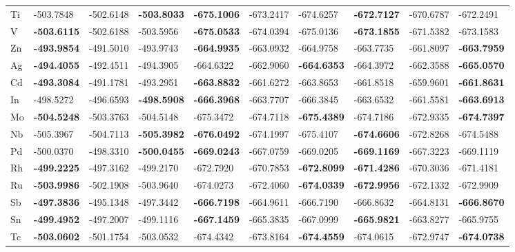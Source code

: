\begin{table}[htbp]
{\begin{tabular}{l *{9}{l}}
      Ti & -503.7848 & -502.6148 & \textbf{-503.8033} & \textbf{-675.1006} & -673.2417 & -674.6257 & \textbf{-672.7127} & -670.6787 & -672.2491 \\
      V  & \textbf{-503.6115} & -502.6188 & -503.5956 & \textbf{-675.0533} & -674.0394 & -675.0136 & \textbf{-673.1855} & -671.5382 & -673.1583 \\
      Zn & \textbf{-493.9854} & -491.5010 & -493.9743 & \textbf{-664.9935} & -663.0932 & -664.9758 & -663.7735 & -661.8097 & \textbf{-663.7959} \\
      Ag & \textbf{-494.4055} & -492.4511 & -494.3905 & -664.6322 & -662.9060 & \textbf{-664.6353} & -664.3972 & -662.3588 & \textbf{-665.0570} \\
      Cd & \textbf{-493.3084} & -491.1781 & -493.2951 & \textbf{-663.8832} & -661.6272 & -663.8653 & -661.8518 & -659.9601 & \textbf{-661.8631} \\
      In & -498.5272 & -496.6593 & \textbf{-498.5908} & \textbf{-666.3968} & -663.7707 & -666.3845 & -663.6532 & -661.5581 & \textbf{-663.6913} \\
      Mo & \textbf{-504.5248} & -503.3763 & -504.5148 & -675.3472 & -674.7118 & \textbf{-675.4389} & -674.7186 & -672.9335 & \textbf{-674.7397} \\
      Nb & -505.3967 & -504.7113 & \textbf{-505.3982} & \textbf{-676.0492} & -674.1997 & -675.4107 & \textbf{-674.6606} & -672.8268 & -674.5488 \\
      Pd & -500.0370 & -498.3310 & \textbf{-500.0455} & \textbf{-669.0243} & -667.0759 & -669.0205 & \textbf{-669.1169} & -667.3223 & -669.1119 \\
      Rh & \textbf{-499.2225} & -497.3162 & -499.2170 & -672.7920 & -670.7853 & \textbf{-672.8099} & \textbf{-671.4286} & -670.3036 & -671.4181 \\
      Ru & \textbf{-503.9986} & -502.1908 & -503.9640 & -674.0273 & -672.4060 & \textbf{-674.0339} & \textbf{-672.9956} & -672.1332 & -672.9909 \\
      Sb & \textbf{-497.3836} & -495.1348 & -497.3442 & \textbf{-666.7198} & -664.9611 & -666.7190 & -666.8632 & -664.8131 & \textbf{-666.8670} \\
      Sn & \textbf{-499.4952} & -497.2007 & -499.1116 & \textbf{-667.1459} & -665.3835 & -667.0999 & \textbf{-665.9821} & -663.8277 & -665.9755 \\
      Tc & \textbf{-503.0602} & -501.1754 & -503.0532 & -674.4342 & -673.8164 & \textbf{-674.4559} & -674.0615 & -672.9747 & \textbf{-674.0738} \\

\end{tabular}}
\end{table}
